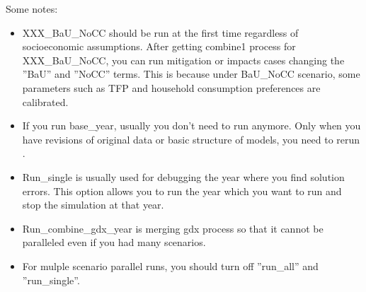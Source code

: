 \documentclass[10pt,a4paper,titlepage,dvipdfmx]{book}
\begin{document}
Some notes:
\begin{itemize}
\item XXX\_BaU\_NoCC should be run at the first time regardless of socioeconomic assumptions. After getting combine1 process for XXX\_BaU\_NoCC, you can run mitigation or impacts cases changing the ''BaU'' and ''NoCC'' terms. This is because under BaU\_NoCC scenario, some parameters such as TFP and household consumption preferences are calibrated.
\item If you run base\_year, usually you don't need to run anymore. Only when you have revisions of original data or basic structure of models, you need to rerun .
\item Run\_single is usually used for debugging the year where you find solution errors. This option allows you to run the year which you want to run and stop the simulation at that year.
\item Run\_combine\_gdx\_year is merging gdx process so that it cannot be paralleled even if you had many scenarios.
\item For mulple scenario parallel runs, you should turn off ''run\_all'' and ''run\_single''.
\end{itemize}
\end{document}
